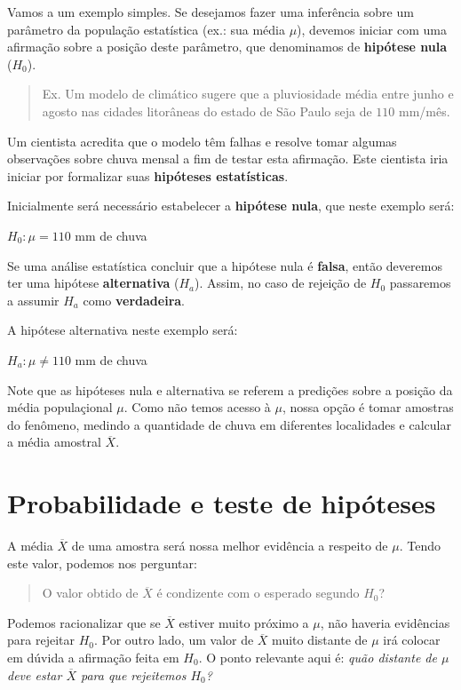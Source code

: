\documentclass[
]{book}
\begin{document}
Vamos a um exemplo simples. Se desejamos fazer uma inferência sobre um parâmetro da população estatística (ex.: sua média \(\mu\)), devemos iniciar com uma afirmação sobre a posição deste parâmetro, que denominamos de \textbf{hipótese nula} (\(H_0\)).

\begin{quote}
Ex. Um modelo de climático sugere que a pluviosidade média entre junho e agosto nas cidades litorâneas do estado de São Paulo seja de \(110\) mm/mês.
\end{quote}

Um cientista acredita que o modelo têm falhas e resolve tomar algumas observações sobre chuva mensal a fim de testar esta afirmação. Este cientista iria iniciar por formalizar suas \textbf{hipóteses estatísticas}.

Inicialmente será necessário estabelecer a \textbf{hipótese nula}, que neste exemplo será:

\(H_0: \mu = 110\) mm de chuva

Se uma análise estatística concluir que a hipótese nula é \textbf{falsa}, então deveremos ter uma hipótese \textbf{alternativa} (\(H_a\)). Assim, no caso de rejeição de \(H_0\) passaremos a assumir \(H_a\) como \textbf{verdadeira}.

A hipótese alternativa neste exemplo será:

\(H_a: \mu \ne 110\) mm de chuva

Note que as hipóteses nula e alternativa se referem a predições sobre a posição da média populaçional \(\mu\). Como não temos acesso à \(\mu\), nossa opção é tomar amostras do fenômeno, medindo a quantidade de chuva em diferentes localidades e calcular a média amostral \(\overline{X}\).

\hypertarget{probabilidade-e-teste-de-hipuxf3teses}{%
\section{Probabilidade e teste de hipóteses}\label{probabilidade-e-teste-de-hipuxf3teses}}

A média \(\overline{X}\) de uma amostra será nossa melhor evidência a respeito de \(\mu\). Tendo este valor, podemos nos perguntar:

\begin{quote}
O valor obtido de \(\overline{X}\) é condizente com o esperado segundo \(H_0\)?
\end{quote}

Podemos racionalizar que se \(\overline{X}\) estiver muito próximo a \(\mu\), não haveria evidências para rejeitar \(H_0\). Por outro lado, um valor de \(\overline{X}\) muito distante de \(\mu\) irá colocar em dúvida a afirmação feita em \(H_0\). O ponto relevante aqui é: \emph{quão distante de \(\mu\) deve estar \(\overline{X}\) para que rejeitemos \(H_0\)?}
\end{document}
